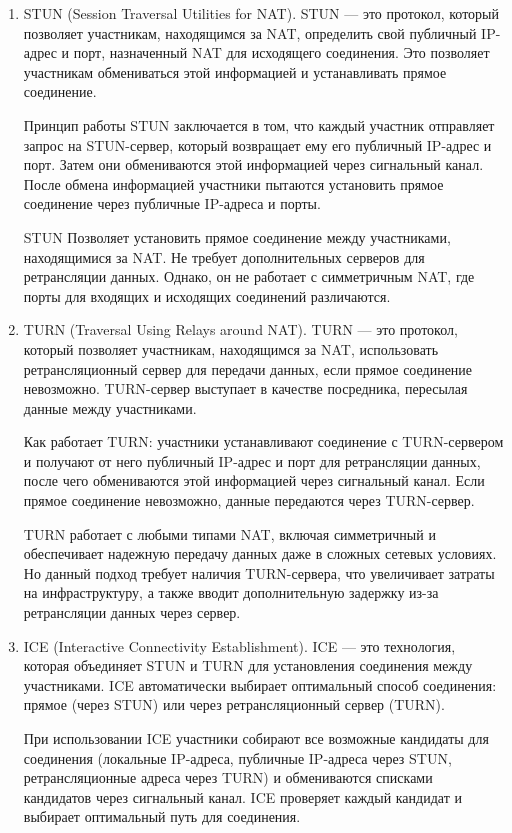\begin{enumerate}
  \item STUN (Session Traversal Utilities for NAT).
  STUN --- это протокол, который позволяет участникам, находящимся за NAT, определить свой публичный IP-адрес и порт, назначенный NAT для исходящего соединения.
  Это позволяет участникам обмениваться этой информацией и устанавливать прямое соединение.
  
  Принцип работы STUN заключается в том, что каждый участник отправляет запрос на STUN-сервер, который возвращает ему его публичный IP-адрес и порт.
  Затем они обмениваются этой информацией через сигнальный канал.
  После обмена информацией участники пытаются установить прямое соединение через публичные IP-адреса и порты.
  
  STUN Позволяет установить прямое соединение между участниками, находящимися за NAT.
  Не требует дополнительных серверов для ретрансляции данных.
  Однако, он не работает с симметричным NAT, где порты для входящих и исходящих соединений различаются.
  
  \item TURN (Traversal Using Relays around NAT).
  TURN --- это протокол, который позволяет участникам, находящимся за NAT, использовать ретрансляционный сервер для передачи данных, если прямое соединение невозможно.
  TURN-сервер выступает в качестве посредника, пересылая данные между участниками.
  
  Как работает TURN: участники устанавливают соединение с TURN-сервером и получают от него публичный IP-адрес и порт для ретрансляции данных, после чего обмениваются этой информацией через сигнальный канал.
  Если прямое соединение невозможно, данные передаются через TURN-сервер.
  
  TURN работает с любыми типами NAT, включая симметричный и обеспечивает надежную передачу данных даже в сложных сетевых условиях.
  Но данный подход требует наличия TURN-сервера, что увеличивает затраты на инфраструктуру, а также вводит дополнительную задержку из-за ретрансляции данных через сервер.
  
  \item ICE (Interactive Connectivity Establishment).
  ICE --- это технология, которая объединяет STUN и TURN для установления соединения между участниками.
  ICE автоматически выбирает оптимальный способ соединения: прямое (через STUN) или через ретрансляционный сервер (TURN).
  
  При использовании ICE участники собирают все возможные кандидаты для соединения (локальные IP-адреса, публичные IP-адреса через STUN, ретрансляционные адреса через TURN) и обмениваются списками кандидатов через сигнальный канал.
  ICE проверяет каждый кандидат и выбирает оптимальный путь для соединения.
  

\end{enumerate}
